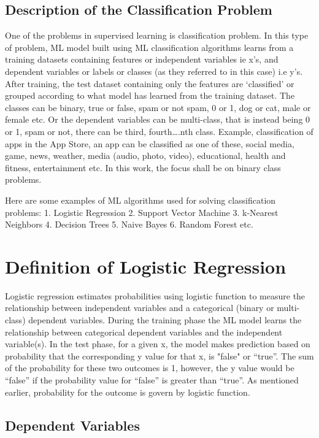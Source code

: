 \documentclass[conference]{IEEEtran}
\begin{document}
\subsection{Description of the Classification Problem}
One of the problems in supervised learning is classification problem. In this type of problem, ML model built using ML classification algorithms learns from a training datasets containing features or independent variables ie x’s, and dependent variables or labels or classes (as they referred to in this case) i.e y’s. After training, the test dataset containing only the features are ‘classified’ or grouped
according to what model has learned from the training dataset. The classes can be binary, true or false, spam or not spam, 0 or 1, dog or cat, male or female etc. Or the dependent variables can be multi-class, that is instead being 0 or 1, spam or not, there can be third, fourth….nth class. Example, classification of apps in the App Store, an app can be classified as one of these, social media, game, news, weather, media (audio, photo, video), educational, health and fitness, entertainment etc. In
this work, the focus shall be on binary class problems.

Here are some examples of ML algorithms used for solving classification problems:
1. Logistic Regression
2. Support Vector Machine
3. k-Nearest Neighbors
4. Decision Trees
5. Naive Bayes
6. Random Forest etc.

\section{Definition of Logistic Regression}
Logistic regression estimates probabilities using logistic function to measure the relationship between independent variables and a categorical (binary or multi-class) dependent variables. During the training phase the ML model learns the relationship between categorical dependent variables and the independent variable(s). In the test phase, for a given x, the model makes prediction based on probability that the corresponding y value for that x, is "false" or “true”. The sum of the
probability for these two outcomes is 1, however, the y value would be “false” if the probability value for “false” is greater than “true”. As mentioned earlier, probability for the outcome is govern by logistic function.

\subsection{Dependent Variables}
\end{document}
